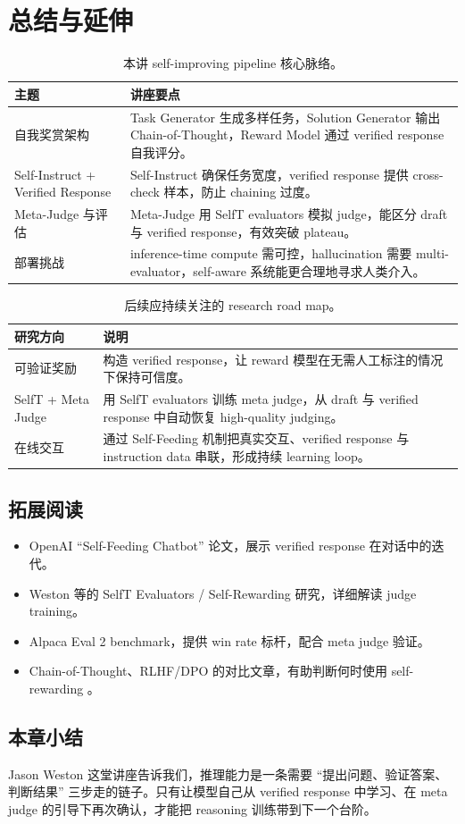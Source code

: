 \section{总结与延伸}
\begin{table}[H]
\centering
\begin{tabular}{p{4.5cm}p{11cm}}
\toprule
主题 & 讲座要点 \\
\midrule
自我奖赏架构 & Task Generator 生成多样任务，Solution Generator 输出 Chain-of-Thought，Reward Model 通过 verified response 自我评分。 \\
Self-Instruct + Verified Response & Self-Instruct 确保任务宽度，verified response 提供 cross-check 样本，防止 chaining 过度。 \\
Meta-Judge 与评估 & Meta-Judge 用 SelfT evaluators 模拟 judge，能区分 draft 与 verified response，有效突破 plateau。 \\
部署挑战 & inference-time compute 需可控，hallucination 需要 multi-evaluator，self-aware 系统能更合理地寻求人类介入。 \\
\bottomrule
\end{tabular}
\caption{本讲 self-improving pipeline 核心脉络。}
\end{table}

\begin{table}[H]
\centering
\begin{tabular}{p{5cm}p{10cm}}
\toprule
研究方向 & 说明 \\
\midrule
可验证奖励 & 构造 verified response，让 reward 模型在无需人工标注的情况下保持可信度。 \\
SelfT + Meta Judge & 用 SelfT evaluators 训练 meta judge，从 draft 与 verified response 中自动恢复 high-quality judging。 \\
在线交互 & 通过 Self-Feeding 机制把真实交互、verified response 与 instruction data 串联，形成持续 learning loop。 \\
\bottomrule
\end{tabular}
\caption{后续应持续关注的 research road map。}
\end{table}

\subsection{拓展阅读}
\begin{itemize}
    \item OpenAI “Self-Feeding Chatbot” 论文，展示 verified response 在对话中的迭代。
    \item Weston 等的 SelfT Evaluators / Self-Rewarding 研究，详细解读 judge training。
    \item Alpaca Eval 2 benchmark，提供 win rate 标杆，配合 meta judge 验证。
    \item Chain-of-Thought、RLHF/DPO 的对比文章，有助判断何时使用 self-rewarding 。
\end{itemize}

\subsection{本章小结}
Jason Weston 这堂讲座告诉我们，推理能力是一条需要 ``提出问题、验证答案、判断结果'' 三步走的链子。只有让模型自己从 verified response 中学习、在 meta judge 的引导下再次确认，才能把 reasoning 训练带到下一个台阶。


